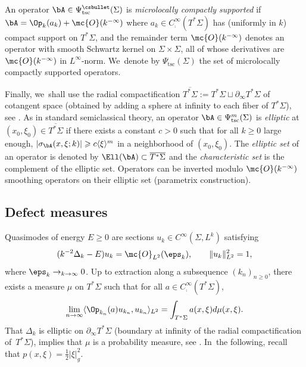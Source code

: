 An operator $\bA \in \Psi^\csbullet_{\mathrm{tsc}}(\Sigma)$ is \emph{microlocally compactly supported} if $\bA = \Op_k(a_k) + \mc{O}(k^{-\infty})$ where $a_k \in C^\infty_{\comp}(T^*\Sigma)$ has (uniformly in $k$) compact support on $T^*\Sigma$, and the remainder term $\mc{O}(k^{-\infty})$ denotes an operator with smooth Schwartz kernel on $\Sigma \times \Sigma$, all of whose derivatives are $\mc{O}(k^{-\infty})$ in $L^\infty$-norm. We~denote by $\Psi^{\comp}_{\mathrm{tsc}}(\Sigma)$ the set of microlocally compactly supported operators.

Finally, we~shall use the radial compactification $\overline{T^*\Sigma} :=
T^*\Sigma \sqcup \partial_\infty T^*\Sigma$ of cotangent space (obtained by
adding a sphere at infinity to each fiber of $T^*\Sigma$), see \cite[App.\,E.1.3]{Dyatlov-Zworski-book}. As in standard semiclassical theory, an operator
$\bA \in \Psi^m_{\mathrm{tsc}}(\Sigma)$ is \emph{elliptic} at $(x_0,\xi_0)
\in \overline{T^*\Sigma}$ if there exists a constant $c > 0$ such that for all
$k \geq 0$ large enough, $|\sigma_{\bA}(x,\xi;k)| \geqslant
c\langle\xi\rangle^m$ in a neighborhood of $(x_0, \xi_0)$. The \emph{elliptic set} of an operator is denoted by $\Ell(\bA) \subset \overline{T^*\Sigma}$ and the \emph{characteristic set} is the complement of the elliptic set. Operators can be inverted modulo $\mc{O}(k^{-\infty})$ smoothing operators on their elliptic set (parametrix construction).

\subsection{Defect measures}

\label{ssection:defect-measures}

Quasimodes of energy $E \geq 0$ are sections $u_{k} \in C^\infty(\Sigma,L^k)$ satisfying
\begin{equation}
\label{equation:qm}
(k^{-2}\Delta_k-E) u_{k} = \mc{O}_{L^2}(\eps_{k}), \qquad \|u_k\|^2_{L^2}=1,
\end{equation}
where $\eps_{k} \to_{k \to \infty} 0$. Up to extraction along a subsequence $(k_n)_{n \geq 0}$, there exists a measure $\mu$ on $T^*\Sigma$ such that for all $a \in C^\infty_{{\comp}}(T^*\Sigma)$,
\begin{equation}
\label{equation:limit}
\lim_{n \to \infty} \langle\Op_{k_n}(a)u_{k_n},u_{k_n}\rangle_{L^2} = \int_{T^*\Sigma} a(x,\xi) d\mu(x,\xi).
\end{equation}
That $\Delta_k$ is elliptic on $\partial_\infty T^*\Sigma$ (boundary at
infinity of the radial compactification of~$T^*\Sigma$), implies that $\mu$ is
a probability measure, see \cite[App.\,E, Exer.\,23]{Dyatlov-Zworski-book}. In~the following, recall that $p(x,\xi) = \tfrac{1}{2}|\xi|^2_g$.

